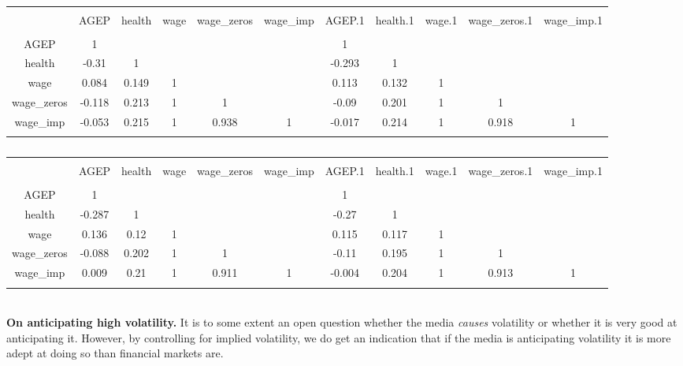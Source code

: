 \documentclass{article}
\begin{document}
	
	\begin{table}[!htbp] \centering 
		\caption{} 
		\label{} 
		\footnotesize
		\begin{tabular}{@{\extracolsep{-3pt}} ccccccccccc} 
			\\[-1.8ex]\hline 
			\hline \\[-1.8ex] 
			& AGEP & health & wage & wage\_zeros & wage\_imp & AGEP.1 & health.1 & wage.1 & wage\_zeros.1 & wage\_imp.1 \\ 
			\hline \\[-1.8ex] 
			AGEP & 1 &  &  &  &  & 1 &  &  &  &  \\ 
			health & -0.31 & 1 &  &  &  & -0.293 & 1 &  &  &  \\ 
			wage & 0.084 & 0.149 & 1 &  &  & 0.113 & 0.132 & 1 &  &  \\ 
			wage\_zeros & -0.118 & 0.213 & 1 & 1 &  & -0.09 & 0.201 & 1 & 1 &  \\ 
			wage\_imp & -0.053 & 0.215 & 1 & 0.938 & 1 & -0.017 & 0.214 & 1 & 0.918 & 1 \\ 
			\hline \\[-1.8ex] 
		\end{tabular} 
	\end{table}
	\begin{table}[!htbp] \centering 
		\caption{} 
		\label{} 
		\footnotesize
		\begin{tabular}{@{\extracolsep{-3pt}} ccccccccccc} 
			\\[-1.8ex]\hline 
			\hline \\[-1.8ex] 
			& AGEP & health & wage & wage\_zeros & wage\_imp & AGEP.1 & health.1 & wage.1 & wage\_zeros.1 & wage\_imp.1 \\ 
			\hline \\[-1.8ex] 
			AGEP & 1 &  &  &  &  & 1 &  &  &  &  \\ 
			health & -0.287 & 1 &  &  &  & -0.27 & 1 &  &  &  \\ 
			wage & 0.136 & 0.12 & 1 &  &  & 0.115 & 0.117 & 1 &  &  \\ 
			wage\_zeros & -0.088 & 0.202 & 1 & 1 &  & -0.11 & 0.195 & 1 & 1 &  \\ 
			wage\_imp & 0.009 & 0.21 & 1 & 0.911 & 1 & -0.004 & 0.204 & 1 & 0.913 & 1 \\ 
			\hline \\[-1.8ex] 
		\end{tabular} 
	\end{table} 
	~\\
	\textbf{On anticipating high volatility.} It is to some extent an open question whether the media \textit{causes} volatility or whether it is very good at anticipating it. However, by controlling for implied volatility, we do get an indication that if the media is anticipating volatility it is more adept at doing so than financial markets are.    
	\
	
\end{document}
